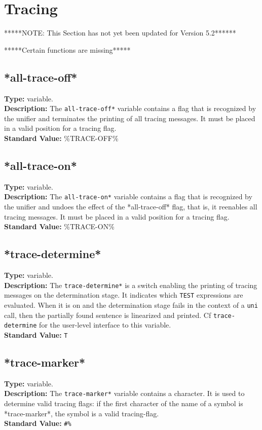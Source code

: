 \documentclass[10pt,a4paper]{report}
\begin{document}
\section{Tracing}

*****NOTE: This Section has not yet been updated for Version 5.2******

*****Certain functions are missing*****

\subsection{*all-trace-off*}
{\bf Type:} variable.
\\{\bf Description:} The {\tt *all-trace-off*} variable contains a flag
that is recognized by the unifier and terminates the printing of
all tracing messages. It must be placed in a valid position for a
tracing flag. 
\\{\bf Standard Value:} \%TRACE-OFF\%

\subsection{*all-trace-on*}
{\bf Type:} variable.
\\{\bf Description:} The {\tt *all-trace-on*} variable contains a flag
that is recognized by the unifier and undoes the effect of the
*all-trace-off* flag, that is, it reenables all tracing messages.
It must be placed in a valid position for a tracing flag.
\\{\bf Standard Value:} \%TRACE-ON\%


\subsection{*trace-determine*}
{\bf Type:} variable.
\\{\bf Description:} The {\tt *trace-determine*} is a switch enabling
the printing of tracing messages on the determination stage. It
indicates which {\tt TEST} expressions are evaluated.  When it is on and the
determination stage fails in the context of a {\tt uni} call, then the
partially found sentence is linearized and printed.  Cf {\tt trace-determine}
for the user-level interface to this variable.
\\{\bf Standard Value:} {\tt T}

\subsection{*trace-marker*}
{\bf Type:} variable.
\\{\bf Description:} The {\tt *trace-marker*} variable contains a
character. It is used to determine valid tracing flags: if the
first character of the name of a symbol is *trace-marker*, the
symbol is a valid tracing-flag. 
\\{\bf Standard Value:} {\tt \#\%}
\end{document}
